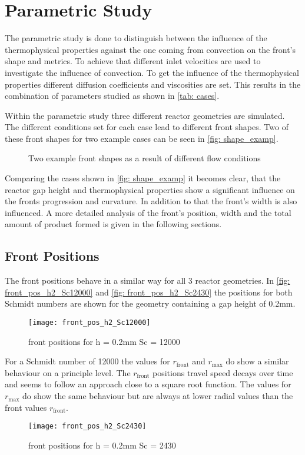 \documentclass[../thesis.tex]{subfiles}
\begin{document}
\chapter{Parametric Study}
\label{chp: para_stud}
The parametric study is done to distinguish between the influence of the thermophysical properties against the one coming from convection on the front's shape and metrics. To achieve that different inlet velocities are used to investigate the influence of convection. To get the influence of the thermophysical properties different diffusion coefficients and viscosities are set. This results in the combination of parameters studied as shown in \autoref{tab: cases}.

Within the parametric study three different reactor geometries are simulated. The different conditions set for each case lead to different front shapes. Two of these front shapes for two example cases can be seen in \autoref{fig: shape_examp}.
\begin{figure}[htb]
	\centering
	\qquad
	\caption{Two example front shapes as a result of different flow conditions}%
	\label{fig: shape_examp}%
\end{figure}
Comparing the cases shown in \autoref{fig: shape_examp} it becomes clear, that the reactor gap height and thermophysical properties show a significant influence on the fronts progression and curvature. In addition to that the front's width is also influenced. A more detailed analysis of the front's position, width and the total amount of product formed is given in the following sections. 

\section{Front Positions}

The front positions behave in a similar way for all 3 reactor geometries. In \autoref{fig: front_pos_h2_Sc12000} and \autoref{fig: front_pos_h2_Sc2430} the positions for both Schmidt numbers are shown for the geometry containing a gap height of 0.2mm.
\begin{figure}[htbp]
	\centering
	\texttt{[image: front\_pos\_h2\_Sc12000]}
	\caption{front positions for  h = 0.2mm Sc = 12000
	\label{fig: front_pos_h2_Sc12000}}
\end{figure}
For a Schmidt number of 12000 the values for $r_{\text{front}}$ and $r_{\text{max}}$ do show a similar behaviour on a principle level. The $r_{\text{front}}$ positions travel speed decays over time and seems to follow an approach close to a square root function. The values for $r_{\text{max}}$ do show the same behaviour but are always at lower radial values than the front values $r_{\text{front}}$.
\begin{figure}[htb]
	\centering
	\texttt{[image: front\_pos\_h2\_Sc2430]}
	\caption{front positions for  h = 0.2mm Sc = 2430
	\label{fig: front_pos_h2_Sc2430}}
\end{figure}
\end{document}
